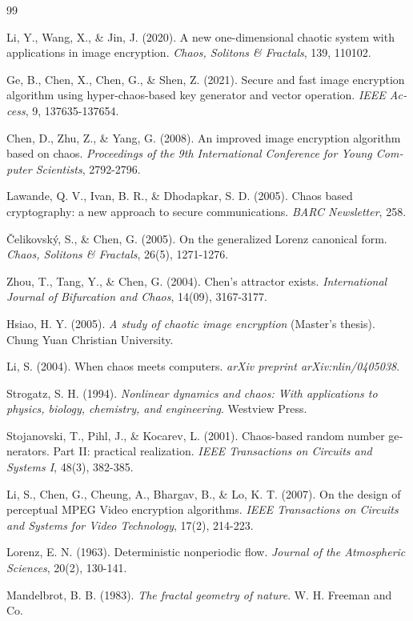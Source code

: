 \begin{thebibliography}{99}
\begin{LTRbibitems}
\begin{latin}
 Li, Y., Wang, X., \& Jin, J. (2020). A new one-dimensional chaotic system with applications in image encryption. \textit{Chaos, Solitons \& Fractals}, 139, 110102.

 Ge, B., Chen, X., Chen, G., \& Shen, Z. (2021). Secure and fast image encryption algorithm using hyper-chaos-based key generator and vector operation. \textit{IEEE Access}, 9, 137635-137654.

 Chen, D., Zhu, Z., \& Yang, G. (2008). An improved image encryption algorithm based on chaos. \textit{Proceedings of the 9th International Conference for Young Computer Scientists}, 2792-2796.

 Lawande, Q. V., Ivan, B. R., \& Dhodapkar, S. D. (2005). Chaos based cryptography: a new approach to secure communications. \textit{BARC Newsletter}, 258.

 Čelikovský, S., \& Chen, G. (2005). On the generalized Lorenz canonical form. \textit{Chaos, Solitons \& Fractals}, 26(5), 1271-1276.

 Zhou, T., Tang, Y., \& Chen, G. (2004). Chen's attractor exists. \textit{International Journal of Bifurcation and Chaos}, 14(09), 3167-3177.

 Hsiao, H. Y. (2005). \textit{A study of chaotic image encryption} (Master's thesis). Chung Yuan Christian University.

 Li, S. (2004). When chaos meets computers. \textit{arXiv preprint arXiv:nlin/0405038}.

 Strogatz, S. H. (1994). \textit{Nonlinear dynamics and chaos: With applications to physics, biology, chemistry, and engineering}. Westview Press.

 Stojanovski, T., Pihl, J., \& Kocarev, L. (2001). Chaos-based random number generators. Part II: practical realization. \textit{IEEE Transactions on Circuits and Systems I}, 48(3), 382-385.

 Li, S., Chen, G., Cheung, A., Bhargav, B., \& Lo, K. T. (2007). On the design of perceptual MPEG Video encryption algorithms. \textit{IEEE Transactions on Circuits and Systems for Video Technology}, 17(2), 214-223.

 Lorenz, E. N. (1963). Deterministic nonperiodic flow. \textit{Journal of the Atmospheric Sciences}, 20(2), 130-141.

 Mandelbrot, B. B. (1983). \textit{The fractal geometry of nature}. W. H. Freeman and Co.


\end{latin}
\end{LTRbibitems}
\end{thebibliography}
